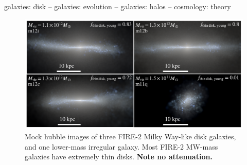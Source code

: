 \documentclass[fleqn,usenatbib]{mnras}
\begin{document}
\begin{keywords}
galaxies: disk -- galaxies: evolution -- galaxies: halos -- cosmology: theory
\end{keywords}



\begin{figure}
    \centering
    \includegraphics[width=\textwidth]{figures/stars.pdf}
    \caption{
    Mock hubble images of three FIRE-2 Milky Way-like disk galaxies, and one lower-mass irregular galaxy.
    Most FIRE-2 MW-mass galaxies have extremely thin disks.
    \textbf{Note no attenuation.}
    }
    \label{f: stars}
\end{figure}
\end{document}
